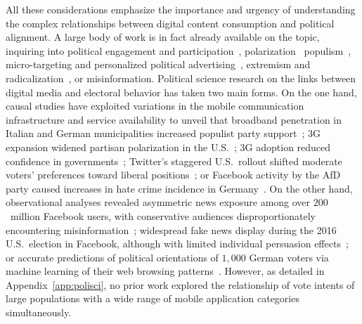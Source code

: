 \documentclass[9pt,sigconf,letterpaper]{acmart}
\begin{document}
All these considerations emphasize the importance and urgency of understanding the complex relationships between digital content consumption and political alignment.
A large body of work is in fact already available on the topic, inquiring into political engagement and participation~\cite{lewis2018candidates, heiss2020pathways, ferrucci2020civic, bobba2018populism, gainous2021active, kim2013influence}, polarization~\cite{de2013polarization, kubin2021role, van2021social, banks2021polarizedfeeds, bail2018exposure, hawdon2020social, beam2020facebook, levy2021social, garimella2021political} populism~\cite{bobba2018populism, perez2021impact, boulianne2020right, schumann2021social, heiss2020stuck}, micro-targeting and personalized political advertising~\cite{haenschen2019mobilizing, sapiezynski2024use, medina2020exploring, beraldo2021political, wei2024digital}, extremism and radicalization~\cite{govers2023down, bhattacharjee2017identifying, grover2019detecting, nouh2019understanding}, or
misinformation\cite{cano2021disinformation, deb2019perils, aimeur2023fake, wu2019misinformation}.
Political science research on the links between digital media and electoral behavior has taken two main forms.
On the one hand, causal studies have exploited variations in the mobile communication infrastructure and service availability to unveil that broadband penetration in Italian and German municipalities increased populist party support~\cite{schaub2020voter}; 3G expansion widened partisan polarization in the U.S.~\cite{melnikov2021mobile}; 3G adoption reduced confidence in governments~\cite{guriev20213g}; Twitter's staggered U.S.\ rollout shifted moderate voters' preferences toward liberal positions~\cite{fujiwara2024effect}; or Facebook activity by the AfD party caused increases in hate crime incidence in Germany~\cite{muller2021fanning}.
On the other hand, observational analyses revealed asymmetric news exposure among over $200$~million Facebook users, with conservative audiences disproportionately encountering misinformation~\cite{gonzalez2023asymmetric}; widespread fake news display during the 2016 U.S.\ election in Facebook, although with limited individual persuasion effects~\cite{allcott2017social}; or accurate predictions of political orientations of $1{,}000$ German voters via machine learning of their web browsing patterns~\cite{kirkizh2024predicting}.
However, as detailed in Appendix~\ref{app:polisci}, no prior work explored the relationship of vote intents of large populations with a wide range of mobile application categories simultaneously.
\end{document}
